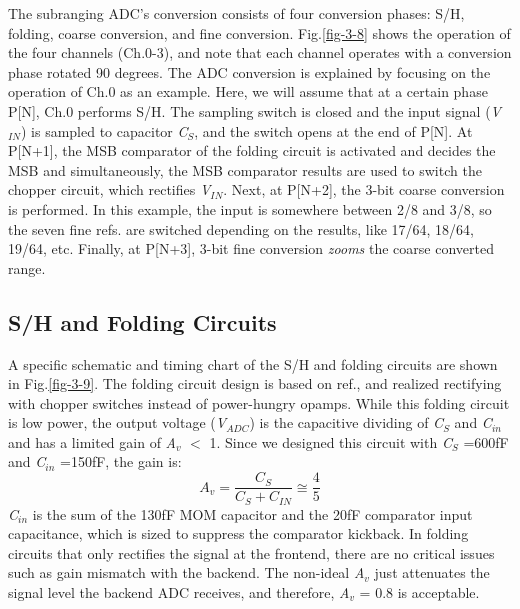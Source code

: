 The subranging ADC's conversion consists of four conversion phases: S/H, folding, coarse conversion, and fine conversion. Fig.\ref{fig-3-8} shows the operation of the four channels (Ch.0-3), and note that each channel operates with a conversion phase rotated 90 degrees. The ADC conversion is explained by focusing on the operation of Ch.0 as an example. Here, we will assume that at a certain phase P[N], Ch.0 performs S/H. The sampling switch is closed and the input signal (\textit{V${}_{IN}$}) is sampled to capacitor \textit{C${}_{S}$}, and the switch opens at the end of P[N]. At P[N+1], the MSB comparator of the folding circuit is activated and decides the MSB and simultaneously, the MSB comparator results are used to switch the chopper circuit, which rectifies \textit{V${}_{IN}$}. Next, at P[N+2], the 3-bit coarse conversion is performed. In this example, the input is somewhere between 2/8 and 3/8, so the seven fine refs. are switched depending on the results, like 17/64, 18/64, 19/64, etc. Finally, at P[N+3], 3-bit fine conversion \textit{zooms} the coarse converted range.

\subsection{S/H and Folding Circuits}

A specific schematic and timing chart of the S/H and folding circuits are shown in Fig.\ref{fig-3-9}. The folding circuit design is based on ref.\cite{verbruggen20102}, and realized rectifying with chopper switches instead of power-hungry opamps. While this folding circuit is low power, the output voltage (\textit{V${}_{ADC}$}) is the capacitive dividing of \textit{C${}_{S}$} and \textit{C${}_{in}$} and has a limited gain of \textit{A${}_{v}$} $\mathrm{<}$ 1. Since we designed this circuit with \textit{C${}_{S}$} =600fF and \textit{C${}_{in}$} =150fF, the gain is:
    \begin{equation}
        A_v=\frac{C_S}{C_S+C_{IN}}\cong \frac{4}{5}
    \end{equation}
\textit{C${}_{in}$} is the sum of the 130fF MOM capacitor and the 20fF comparator input capacitance, which is sized to suppress the comparator kickback. In folding circuits that only rectifies the signal at the frontend, there are no critical issues such as gain mismatch with the backend. The non-ideal \textit{A${}_{v}$} just attenuates the signal level the backend ADC receives, and therefore, \textit{A${}_{v}$} = 0.8 is acceptable. 

